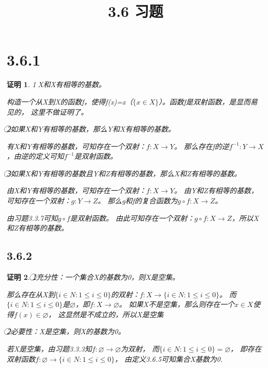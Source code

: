 \documentclass{article}
\theoremstyle{mystyle}
\theoremstyle{zproofstyle}
\newtheorem*{zproof}{证明}
\begin{document}
\title{3.6 习题}
\maketitle

\section*{3.6.1}
\begin{zproof}
  \textcircled{1}X和X有相等的基数。

  构造一个从X到X的函数f，使得f(x)=x（$\{x \in X\}$）。函数f是双射函数，是显而易见的，
  这里不做证明了。

  \textcircled{2}如果X和Y有相等的基数，那么Y和X有相等的基数。

  有X和Y有相等的基数，可知存在一个双射：$f: X \rightarrow Y$。
  那么存在f的逆$f^{-1}: Y \rightarrow X$，由逆的定义可知$f^{-1}$是双射函数。

  \textcircled{3}如果X和Y有相等的基数且Y和Z有相等的基数，那么X和Z有相等的基数。

  由X和Y有相等的基数，可知存在一个双射：$f: X \rightarrow Y$。
  由Y和Z有相等的基数，可知存在一个双射：$g: Y \rightarrow Z$。
  那么g和f的复合函数为$g \circ f: X \rightarrow Z$。

  由习题3.3.7可知$g \circ f$是双射函数。
  由此可知存在一个双射：$g \circ f: X \rightarrow Z$，所以X和Z有相等的基数。
\end{zproof}

\subsection*{3.6.2}
\begin{zproof}
  \textcircled{1}充分性：一个集合X的基数为0，则X是空集。

  那么存在从X到$\{i \in N: 1 \leq i \leq 0\}$的双射：$f: X \rightarrow \{i \in N: 1 \leq i \leq 0\}$。
  而$\{i \in N: 1 \leq i \leq 0\}$是$\varnothing$，即$f: X \rightarrow \varnothing$。
  如果X不是空集，那么则存在一个$x \in X$使得$f(x) \in \varnothing$，
  这显然是不成立的，所以X是空集

  \textcircled{2}必要性：X是空集，则X的基数为0。

  若X是空集，由习题3.3.3知$f:\varnothing \rightarrow \varnothing$为双射，
  而$\{i \in N : 1 \leq i \leq 0\}=\varnothing$，
  即存在双射函数$f:\varnothing \rightarrow \{i \in N : 1 \leq i \leq 0\}$，
  由定义3.6.5可知集合X基数为0.
\end{zproof}
\end{document}
